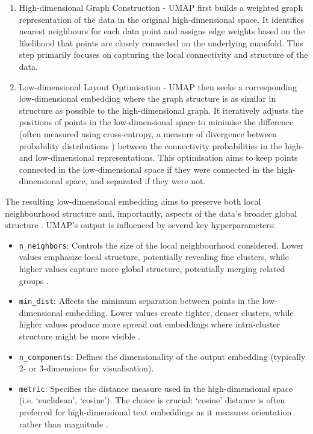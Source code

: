 \documentclass[10pt,oneside]{report}
\begin{document}
\begin{enumerate}
    \item High-dimensional Graph Construction - UMAP first builds a weighted graph representation of the data in the original high-dimensional space. It identifies nearest neighbours for each data point and assigns edge weights based on the likelihood that points are closely connected on the underlying manifold. This step primarily focuses on capturing the local connectivity and structure of the data.
    \item Low-dimensional Layout Optimisation - UMAP then seeks a corresponding low-dimensional embedding where the graph structure is as similar in structure as possible to the high-dimensional graph. It iteratively adjusts the positions of points in the low-dimensional space to minimise the difference (often measured using cross-entropy, a measure of divergence between probability distributions \cite{zhang2018generalized}) between the connectivity probabilities in the high- and low-dimensional representations. This optimisation aims to keep points connected in the low-dimensional space if they were connected in the high-dimensional space, and separated if they were not.
\end{enumerate}

The resulting low-dimensional embedding aims to preserve both local neighbourhood structure and, importantly, aspects of the data's broader global structure \cite{mcinnes2018umap}. UMAP's output is influenced by several key hyperparameters:
\begin{itemize}
    \item \texttt{n\_neighbors}: Controls the size of the local neighbourhood considered. Lower values emphasize local structure, potentially revealing fine clusters, while higher values capture more global structure, potentially merging related groups \cite{mcinnes2018umap}.
    \item \texttt{min\_dist}: Affects the minimum separation between points in the low-dimensional embedding. Lower values create tighter, denser clusters, while higher values produce more spread out embeddings where intra-cluster structure might be more visible \cite{mcinnes2018umap}.
    \item \texttt{n\_components}: Defines the dimensionality of the output embedding (typically 2- or 3-dimensions for visualisation).
    \item \texttt{metric}: Specifies the distance measure used in the high-dimensional space (i.e. `euclidean', `cosine'). The choice is crucial: `cosine' distance is often preferred for high-dimensional text embeddings as it measures orientation rather than magnitude \cite{mcinnes2018umap}.
\end{itemize}
\end{document}
